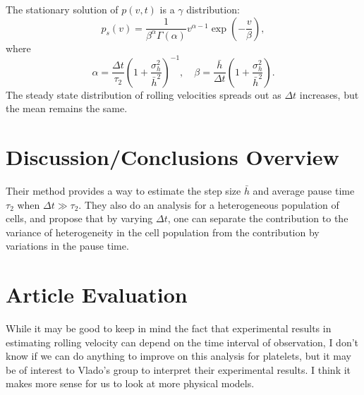 \documentclass[
10pt, %
letterpaper, %
twocolumn, %
landscape %
]{article}
\begin{document}
The stationary solution of $p(v, t)$ is a $\gamma$ distribution:
\begin{equation}
  \label{eq:stable_distribution}
  p_s(v) = \frac{1}{\beta^\alpha\Gamma(\alpha)} v^{\alpha-1}
  \exp\left(-\frac{v}{\beta}\right),
\end{equation}
where
\begin{equation*}
  \alpha = \frac{\Delta t}{\tau_2} \left(1 +
    \frac{\sigma_h^2}{\bar{h}^2}\right)^{-1}, \quad 
  \beta = \frac{\bar{h}}{\Delta t} \left(1 +
    \frac{\sigma^2_h}{\bar{h}^2}\right). 
\end{equation*}
The steady state distribution of rolling velocities spreads out as
$\Delta t$ increases, but the mean remains the same. 



\section{Discussion/Conclusions Overview}

Their method provides a way to estimate the step size $\bar{h}$ and
average pause time $\tau_2$ when $\Delta t \gg \tau_2$. They also do
an analysis for a heterogeneous population of cells, and propose that
by varying $\Delta t$, one can separate the contribution to the
variance of heterogeneity in the cell population from the contribution
by variations in the pause time. 


\section{Article Evaluation}

While it may be good to keep in mind the fact that experimental
results in estimating rolling velocity can depend on the time interval
of observation, I don't know if we can do anything to improve on this
analysis for platelets, but it may be of interest to Vlado's group to
interpret their experimental results. I think it makes more sense for
us to look at more physical models.


\renewcommand{\refname}{Reference} %



\end{document}
